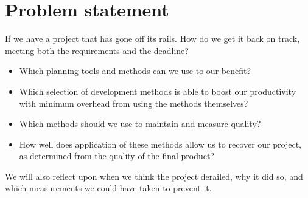 \section{Problem statement}
If we have a project that has gone off its rails. How do we get it back on track, meeting both the requirements and the deadline?
\begin{itemize}
\item Which planning tools and methods can we use to our benefit?
\item Which selection of development methods is able to boost our productivity with minimum overhead from using the methods themselves?
\item Which methods should we use to maintain and measure quality?
\item How well does application of these methods allow us to recover our project, as determined from the quality of the final product?
\end{itemize}
We will also reflect upon when we think the project derailed, why it did so, and which measurements we could have taken to prevent it.
\newpage